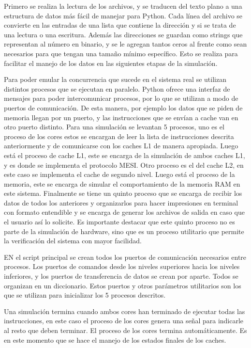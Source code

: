 \documentclass {article}
\begin{document}
Primero se realiza la lectura de los archivos, y se traducen del texto plano a una estructura de
datos más fácil de manejar para Python. Cada línea del archivo se convierte en las entradas de una
lista que contiene la dirección y si se trata de una lectura o una escritura. Además las
direcciones se guardan como strings que representan al número en binario, y se le agregan tantos
ceros al frente como sean necesarios para que tengan una tamaño mínimo específico. Esto se realiza
para facilitar el manejo de los datos en las siguientes etapas de la simulación.


Para poder emular la concurrencia que sucede en el sistema real se utilizan distintos procesos que
se ejecutan en paralelo. Python ofrece una interfaz de mensajes para poder intercomunicar procesos,
por lo que se utilizan a modo de puertos de comunicación. De esta manera, por ejemplo los datos que
se piden de memoria llegan por un puerto, y las instrucciones que se envían a cache van en otro
puerto distinto. Para una simulación se levantan 5 procesos, uno es el proceso de los cores estos se
encargan de leer la lista de instrucciones descrita anteriormente y de comunicarse con los caches L1
de manera apropiada. Luego está el proceso de cache L1, este se encarga de la simulación de ambos
caches L1, y es donde se implementa el protocolo MESI. Otro proceso es el del cache L2, en este caso
se implementa el cache de segundo nivel. Luego está el proceso de la memoria, este se encarga de
simular el comportamiento de la memoria RAM en este sistema. Finalmente se tiene un quinto proceso
que se encarga de recibir los datos de todos los anteriores y organizarlos para hacer impresiones en
terminal con formato entendible y se encarga de generar los archivos de salida en caso que el
usuario así lo solicite. Es importante destacar que este quinto proceso no es parte de la simulación
de hardware, sino que es un proceso utilitario que permite la verificación del sistema con mayor
facilidad.

EN el script principal se crean todos los puertos de comunicación necesarios entre procesos. Los
puertos de comandos desde los niveles superiores hacia los niveles inferiores, y los puertos de
transferencia de datos se crean por aparte. Todos se organizan en un diccionario. Estos puertos y
otros parámetros utilitarios son los que se utilizan para inicializar los 5 procesos descritos.

Una simulación termina cuando ambos cores han terminado de ejecutar todas las instrucciones, en este
caso el proceso de los cores genera una señal para indicarle al resto que deben terminar. El proceso
de los cores termina automáticamente. Es en este momento que se hace el manejo de los estados
finales de los caches.
\end{document}
